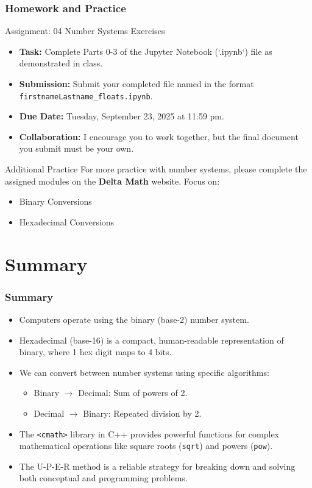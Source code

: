 \documentclass{beamer}
\begin{document}
\begin{frame}
\frametitle{Homework and Practice}

\begin{block}{Assignment: 04 Number Systems Exercises}
    \begin{itemize}
        \item \textbf{Task:} Complete Parts 0-3 of the Jupyter Notebook (`.ipynb`) file as demonstrated in class.
        \item \textbf{Submission:} Submit your completed file named in the format \alert{\texttt{firstnameLastname\_floats.ipynb}}.
        \item \textbf{Due Date:} \alert{Tuesday, September 23, 2025 at 11:59 pm}.
        \item \textbf{Collaboration:} I encourage you to work together, but the final document you submit must be your own.
    \end{itemize}
\end{block}

\vfill

\begin{alertblock}{Additional Practice}
For more practice with number systems, please complete the assigned modules on the \textbf{Delta Math} website. Focus on:
\begin{itemize}
    \item Binary Conversions
    \item Hexadecimal Conversions
\end{itemize}
\end{alertblock}
\end{frame}

\section{Summary}

\begin{frame}
\frametitle{Summary}
\begin{itemize}
    \item Computers operate using the \alert{binary} (base-2) number system.
    \item \alert{Hexadecimal} (base-16) is a compact, human-readable representation of binary, where 1 hex digit maps to 4 bits.
    \item We can convert between number systems using specific algorithms:
    \begin{itemize}
        \item Binary $\rightarrow$ Decimal: Sum of powers of 2.
        \item Decimal $\rightarrow$ Binary: Repeated division by 2.
    \end{itemize}
    \item The \texttt{<cmath>} library in C++ provides powerful functions for complex mathematical operations like square roots (\texttt{sqrt}) and powers (\texttt{pow}).
    \item The \alert{U-P-E-R method} is a reliable strategy for breaking down and solving both conceptual and programming problems.
\end{itemize}
\end{frame}
\end{document}
